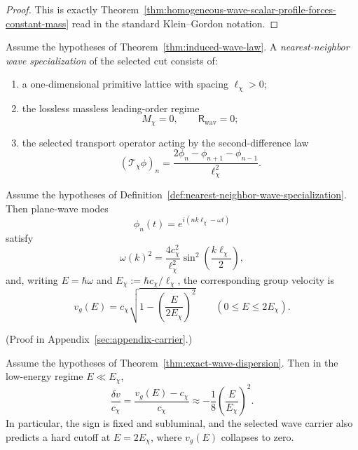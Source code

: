 \begin{proof}
This is exactly
Theorem~\ref{thm:homogeneous-wave-scalar-profile-forces-constant-mass} read in
the standard Klein--Gordon notation.
\end{proof}

\begin{definition}
\label{def:nearest-neighbor-wave-specialization}
Assume the hypotheses of
Theorem~\ref{thm:induced-wave-law}. A \emph{nearest-neighbor wave
specialization} of the selected cut consists of:
\begin{enumerate}[label=(\roman*),itemsep=0.2em]
\item a one-dimensional primitive lattice with spacing \(\ell_{\chi}>0\);
\item the lossless massless leading-order regime
      \[
      M_{\chi}=0,
      \qquad
      \mathsf R_{\mathrm{wav}}=0;
      \]
\item the selected transport operator acting by the second-difference law
      \[
      (\mathcal T_{\chi}\phi)_n
      =
      \frac{2\phi_n-\phi_{n+1}-\phi_{n-1}}{\ell_{\chi}^2}.
      \]
\end{enumerate}
\end{definition}

\begin{theorem}
\label{thm:exact-wave-dispersion}
Assume the hypotheses of
Definition~\ref{def:nearest-neighbor-wave-specialization}. Then plane-wave
modes
\[
\phi_n(t)=e^{i(nk\ell_{\chi}-\omega t)}
\]
satisfy
\[
\omega(k)^2
=
\frac{4c_{\chi}^2}{\ell_{\chi}^2}
\sin^2\!\left(\frac{k\ell_{\chi}}{2}\right),
\]
and, writing \(E=\hbar\omega\) and \(E_{\chi}:=\hbar c_{\chi}/\ell_{\chi}\),
the corresponding group velocity is
\[
v_g(E)
=
c_{\chi}\sqrt{1-\left(\frac{E}{2E_{\chi}}\right)^2}
\qquad (0\le E\le 2E_{\chi}).
\]
\end{theorem}

(Proof in Appendix~\ref{sec:appendix-carrier}.)

\begin{corollary}
\label{cor:observable-wave-carrier-signature}
Assume the hypotheses of
Theorem~\ref{thm:exact-wave-dispersion}. Then in the low-energy regime
\(E\ll E_{\chi}\),
\[
\frac{\delta v}{c_{\chi}}
=
\frac{v_g(E)-c_{\chi}}{c_{\chi}}
\approx
-\frac18\left(\frac{E}{E_{\chi}}\right)^2.
\]
In particular, the sign is fixed and subluminal, and the selected wave carrier
also predicts a hard cutoff at \(E=2E_{\chi}\), where \(v_g(E)\) collapses to
zero.
\end{corollary}

